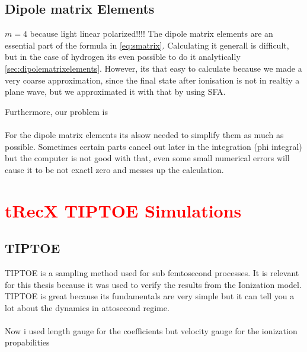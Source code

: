 \subsection{Dipole matrix Elements}
$m=4$ because light linear polarized!!!!
The dipole matrix elements are an essential part of the formula in \eqref{eq:smatrix}. 
Calculating it generall is difficult, but in the case of hydrogen its even possible to do it analytically \ref{sec:dipolematrixelements}.
However, its that easy to calculate because we made a very coarse approximation, since the final state after ionisation is not in realtiy a plane wave, but we approximated it with that by using SFA.

Furthermore, our problem is \\\\

For the dipole matrix elements its alsow needed to simplify them as much as possible. 
Sometimes certain parts cancel out later in the integration (phi integral) but the computer is not good with that, even some small numerical errors will cause it to be not exactl zero and messes up the calculation.




\section{\textcolor{red}{tRecX TIPTOE Simulations}}
\subsection{TIPTOE}
TIPTOE \cite{Park:18} is a sampling method used for sub femtosecond processes. It is relevant for this thesis because it was used to verify the results from the Ionization model. 
TIPTOE is great because its fundamentals are very simple but it can tell you a lot about the dynamics in attosecond regime. \\\\

Now i used length gauge for the coefficients but velocity gauge for the ionization propabilities





